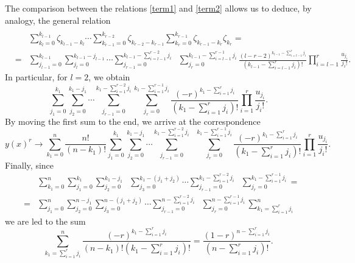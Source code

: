 \documentclass[10pt]{amsart}
\numberwithin{equation}{section}
\newcommand{\nn}{\nonumber}
\theoremstyle{definition}
\begin{document}
The comparison between the relations  \eqref{term1} and  \eqref{term2} allows
us to deduce, by analogy, the general relation
\begin{eqnarray}
\\
\nn
&&\sum _{k_{l}=0}^{k_{l-1}}\zeta _{k_{l-1}-k_{l}}\cdots \sum _{k_{r-1}=0}^{k_{r-2}}
\zeta _{k_{r-2}-k_{r-1}}\sum _{k_{r}=0}^{k_{r-1}}\zeta _{k_{r-1}-k_{r}}
\zeta _{k_{r}} =
\label{eqC.12}
\\
\nonumber
&=&\sum _{j_{l-1}=0}^{k_{l-1}} \sum _{j_{l}=0}^{k_{l-1}-j_{l-1}}
\cdots \sum _{j_{r-1}=0}^{k_{l-1}-\sum_{i=l-1}^{r-2}j_i} \;\;\sum _{j_{r}=0}^{k_{l-1}-\sum_{i=l-1}^{r-1}j_i}
\frac{(l-r-2)^{k_{l-1}-\sum _{i=l-1}^{r}j_{i}}}{( k_{l-1}-\sum _{i=l-1}^{r}j_{i})!}
\prod _{i=l-1}^{r} \frac{u_{j_{i}}}{j_{i}!}.
\end{eqnarray}
In particular, for $l=2$, we obtain
\begin{equation}
\sum _{j_{1}=0}^{k_{1}} \sum _{j_{2}=0}^{k_{1}-j_{1}} \cdots \sum _{j_{r-1}=0}^{k_{1}-\sum _{i=1}^{r-2}j_{i}}
\sum _{j_{r}=0}^{k_{1}-\sum _{i=1}^{r-1}j_{i}}
\frac{(-r)^{k_{1}-\sum _{i=1}^{r}j_{i}}}{( k_{1}-\sum _{i=1}^{r}j_{i})!}
\prod _{i=1}^{r} \frac{u_{j_{i}}}{j_{i}!}.
\label{eqC.13}
\end{equation}
By moving the first sum to the end, we arrive at the correspondence
\begin{equation}
y(x)^{r}\to \sum _{k_{1}=0}^{n}\frac{n!}{(n-k_{1})!} \sum _{j_{1}=0}^{k_{1}}
\sum _{j_{2}=0}^{k_{1}-j_{1}} \cdots \sum _{j_{r-1}=0}^{k_{1}-\sum _{i=1}^{r-2}j_{i}}\;\;
\sum _{j_{r}=0}^{k_{1}-\sum _{i=1}^{r-1}j_{i}}
\frac{(-r)^{k_{1}-\sum _{i=1}^{r}j_{i}}}{( k_{1}-\sum _{i=1}^{r}j_{i})!}
\prod _{i=1}^{r} \frac{u_{j_{i}}}{j_{i}!}.
\label{eqC.14}
\end{equation}
Finally, since
\begin{eqnarray}
&&\sum _{k_{1}=0}^{n} \sum _{j_{1}=0}^{k_{1}} \sum _{j_{2}=0}^{k_{1}-j_{1}}\;\;\sum _{j_{3}=0}^{k_{1}-(j_{1}+j_2)}
\cdots \sum _{j_{r-1}=0}^{k_{1}-\sum _{i=1}^{r-2}j_{i}}\;\; \sum _{j_{r}=0}^{k_{1}-\sum _{i=1}^{r-1}j_{i}} =
\label{eqC.15}
\\
&=& \sum _{j_{1}=0}^{n} \sum _{j_{2}=0}^{n-j_1}\sum _{j_{3}=0}^{n-(j_1+j_2)} 
\cdots \sum _{j_{r-1}=0}^{n-\sum _{i=1}^{r-2}j_{i}} \;\;\sum _{j_{r}=0}^{n-\sum _{i=1}^{r-1}j_{i}} \sum _{k_{1}=\sum _{i=1}^{r}{j_{i}}}^{n}
\nonumber
\end{eqnarray}
we are led to the sum
\begin{equation}
\sum _{k_{1}=\sum _{i=1}^{r}{j_{i}}}^{n}
\frac{(-r)^{k_{1}-\sum _{i=1}^{r}j_{i}}}{(n-k_{1})!( k_{1}-\sum _{i=1}^{r}j_{i})!}=
\frac{(1-r)^{n-\sum _{i=1}^{r}j_{i}}}{(n-\sum _{i=1}^{r}j_{i})!}.
\label{eqC.16}
\end{equation}
\end{document}
